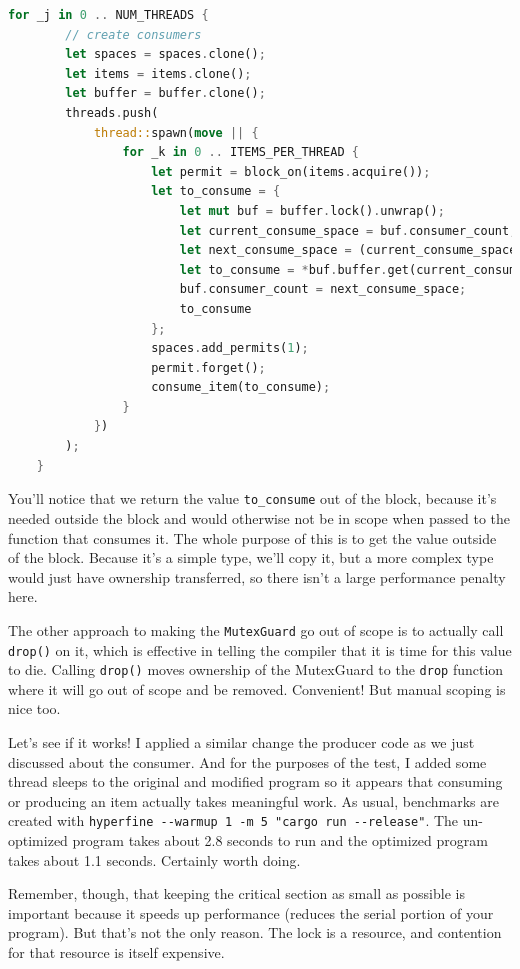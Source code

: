\documentclass[a4paper]{report}
\begin{document}
\begin{lstlisting}[language=Rust]
    for _j in 0 .. NUM_THREADS {
        // create consumers
        let spaces = spaces.clone();
        let items = items.clone();
        let buffer = buffer.clone();
        threads.push(
            thread::spawn(move || {
                for _k in 0 .. ITEMS_PER_THREAD {
                    let permit = block_on(items.acquire());
                    let to_consume = {
                        let mut buf = buffer.lock().unwrap();
                        let current_consume_space = buf.consumer_count;
                        let next_consume_space = (current_consume_space + 1) % buf.buffer.len();
                        let to_consume = *buf.buffer.get(current_consume_space).unwrap();
                        buf.consumer_count = next_consume_space;
                        to_consume
                    };
                    spaces.add_permits(1);
                    permit.forget();
                    consume_item(to_consume);
                }
            })
        );
    }
\end{lstlisting}

You'll notice that we return the value \texttt{to\_consume} out of the block, because it's needed outside the block and would otherwise not be in scope when passed to the function that consumes it. The whole purpose of this is to get the value outside of the block. Because it's a simple type, we'll copy it, but a more complex type would just have ownership transferred, so there isn't a large performance penalty here.

The other approach to making the \texttt{MutexGuard} go out of scope is to actually call \texttt{drop()} on it, which is effective in telling the compiler that it is time for this value to die. Calling \texttt{drop()} moves ownership of the MutexGuard to the \texttt{drop} function where it will go out of scope and be removed. Convenient! But manual scoping is nice too.

Let's see if it works! I applied a similar change the producer code as we just discussed about the consumer. And for the purposes of the test, I added some thread sleeps to the original and modified program so it appears that consuming or producing an item actually takes meaningful work. As usual, benchmarks are created with \verb+hyperfine --warmup 1 -m 5 "cargo run --release"+. The un-optimized program takes about 2.8 seconds to run and the optimized program takes about 1.1 seconds. Certainly worth doing.

Remember, though, that keeping the critical section as small as possible is important because it speeds up performance (reduces the serial portion of your program). But that's not the only reason. The lock is a resource, and contention for that resource is itself expensive.
\end{document}
